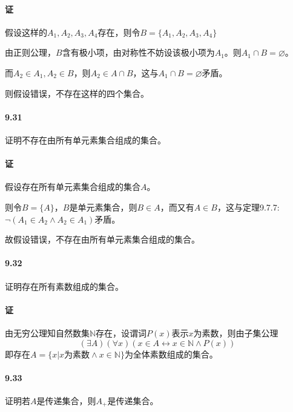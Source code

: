 \documentclass[UTF8]{ctexart}
\newcommand{\snatural}{\mathbb{N}}
\begin{document}
\paragraph{证}
假设这样的$A_1, A_2, A_3, A_4$存在，则令$B=\{A_1, A_2, A_3, A_4\}$

由正则公理，$B$含有极小项，由对称性不妨设该极小项为$A_1$。则$A_1 \cap B = \varnothing$。

而$A_2 \in A_1, A_2 \in B$，则$A_2 \in A \cap B$，这与$A_1 \cap B = \varnothing$矛盾。

则假设错误，不存在这样的四个集合。

\paragraph{9.31} \label{9.31}
证明不存在由所有单元素集合组成的集合。

\paragraph{证}
假设存在所有单元素集合组成的集合$A$。

则令$B=\{A\}$，$B$是单元素集合，则$B \in A$，而又有$A \in B$，这与定理9.7.7: $\lnot (A_1 \in A_2 \land A_2 \in A_1)$矛盾。

故假设错误，不存在由所有单元素集合组成的集合。

\paragraph{9.32} \label{9.32}
证明存在所有素数组成的集合。

\paragraph{证}
由无穷公理知自然数集$\snatural$存在，设谓词$P(x)$表示$x$为素数，则由子集公理
$$(\exists A)(\forall x)(x \in A \longleftrightarrow x \in \snatural \land P(x))$$
即存在$A=\{x|x\text{为素数}\land x \in \snatural\}$为全体素数组成的集合。

\paragraph{9.33} \label{9.33}
证明若$A$是传递集合，则$A_+$是传递集合。
\end{document}
